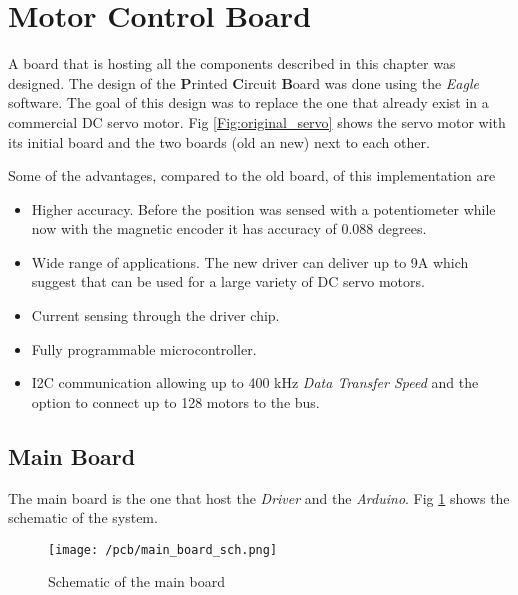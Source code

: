 


\section{Motor Control Board}

A board that is hosting all the components described in this chapter was designed. The design of the \textbf{P}rinted \textbf{C}ircuit \textbf{B}oard was done using the \textit{Eagle} software. The goal of this design was to replace the one that already exist in a commercial DC servo motor. Fig \ref{Fig:original_servo} shows the servo motor with its initial board and the two boards (old an new) next to each other.

Some of the advantages, compared to the old board, of this implementation are

\begin{itemize}
	\item Higher accuracy. Before the position was sensed with a potentiometer while now with the magnetic encoder it has accuracy of 0.088 degrees.
	\item Wide range of applications. The new driver can deliver up to 9A which suggest that can be used for a large variety of DC servo motors.
	\item Current sensing through the driver chip.
	\item Fully programmable microcontroller.
	\item I2C communication allowing up to 400 kHz \textit{Data Transfer Speed} and the option to connect up to 128 motors to the bus.
\end{itemize}



\subsection{Main Board}

The main board is the one that host the \textit{Driver} and the \textit{Arduino}. Fig \ref{Fig:main_board_sch} shows the schematic of the system.

\begin{figure}[H]
	\centering
	\texttt{[image: /pcb/main\_board\_sch.png]}
	\caption{Schematic of the main board}
	\label{Fig:main_board_sch}
\end{figure} 



